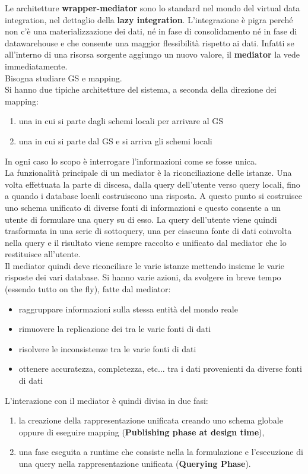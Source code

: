 Le architetture \textbf{wrapper-mediator} sono lo standard nel mondo del virtual data integration, nel dettaglio della \textbf{lazy integration}. L'integrazione è pigra perché non c'è una materializzazione dei dati, né in fase di consolidamento né in fase di datawarehouse e che consente una maggior flessibilità rispetto ai dati. Infatti se all'interno di una risorsa sorgente aggiungo un nuovo valore, il \textbf{mediator} la vede immediatamente. \\ Bisogna studiare GS e mapping.\\ 
Si hanno due tipiche architetture del sistema, a seconda della direzione dei mapping:
\begin{enumerate}
  \item una in cui si parte dagli schemi locali per arrivare al GS
  \item una in cui si parte dal GS e si arriva gli schemi locali
\end{enumerate}
In ogni caso lo scopo è interrogare l'informazioni come se fosse unica.\\

La funzionalità principale di un mediator è la riconciliazione delle istanze. Una volta effettuata la parte di discesa, dalla query dell'utente verso query locali, fino a quando i database locali costruiscono una risposta. A questo punto si costruisce uno schema unificato di diverse fonti di informazioni e questo consente a un utente di formulare una query su di esso. La query dell'utente viene quindi trasformata in una serie di sottoquery, una per ciascuna fonte di dati coinvolta nella query e il risultato viene sempre raccolto e unificato dal mediator che lo restituisce all'utente.\\ 
Il mediator quindi deve riconciliare le varie istanze mettendo insieme le varie risposte dei vari database. Si hanno varie azioni, da svolgere in breve tempo (essendo tutto on the fly), fatte dal mediator:
\begin{itemize}
  \item raggruppare informazioni sulla stessa entità del mondo reale 
  \item rimuovere la replicazione dei tra le varie fonti di dati 
  \item risolvere le inconsistenze tra le varie fonti di dati 
  \item ottenere accuratezza, completezza, etc$\ldots$ tra i dati provenienti da diverse fonti di dati   
\end{itemize}
L'interazione con il mediator è quindi divisa in due fasi:
\begin{enumerate}
  \item la creazione della rappresentazione unificata creando uno schema globale oppure di eseguire mapping (\textbf{Publishing phase at design time}),
  \item una fase eseguita a runtime che consiste nella la formulazione e l'esecuzione di una query nella rappresentazione unificata (\textbf{Querying Phase}).
\end{enumerate}

